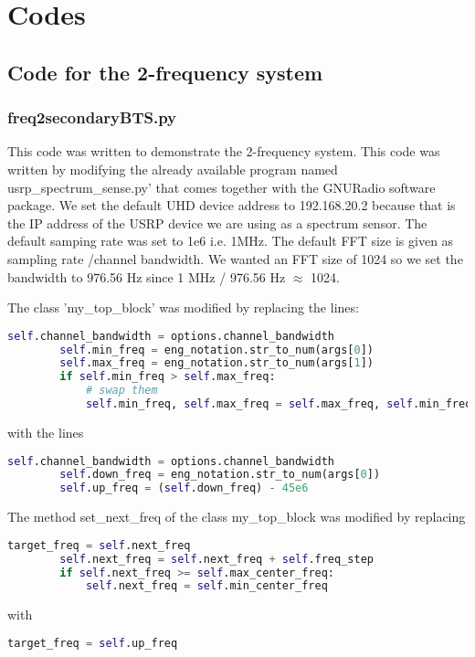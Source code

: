 \chapter{Codes}

\section{Code for the 2-frequency system}


\subsection{freq2secondaryBTS.py}

This code was written to demonstrate the 2-frequency system.
This code was written by modifying the already available program named 
\textsf{usrp\_spectrum\_sense.py'} that comes together with the GNURadio software
package. We set the 
default UHD device address to \textsf{192.168.20.2} because that is the IP address
of the USRP device we are using as a spectrum sensor. The default samping rate
was set to 1e6 i.e. 1MHz. The default FFT size is given as
\textsf{sampling rate /channel bandwidth}. We wanted an FFT size of 1024 so we
set the bandwidth to
976.56 Hz since 1 MHz / 976.56 Hz $\approx$ 1024.

The class 'my\_top\_block' was modified by replacing the lines:
\begin{lstlisting}[language=Python]
        self.channel_bandwidth = options.channel_bandwidth
        self.min_freq = eng_notation.str_to_num(args[0])
        self.max_freq = eng_notation.str_to_num(args[1])
        if self.min_freq > self.max_freq:
            # swap them
            self.min_freq, self.max_freq = self.max_freq, self.min_freq    
\end{lstlisting}
with the lines
\begin{lstlisting}[language=Python]
        self.channel_bandwidth = options.channel_bandwidth
        self.down_freq = eng_notation.str_to_num(args[0])
        self.up_freq = (self.down_freq) - 45e6    
\end{lstlisting}

The method \textsf{set\_next\_freq} of the class \textsf{my\_top\_block} was modified by
replacing
\begin{lstlisting}[language=Python]
        target_freq = self.next_freq
        self.next_freq = self.next_freq + self.freq_step
        if self.next_freq >= self.max_center_freq:
            self.next_freq = self.min_center_freq
\end{lstlisting}
with
\begin{lstlisting}[language=Python]
        target_freq = self.up_freq
\end{lstlisting}




